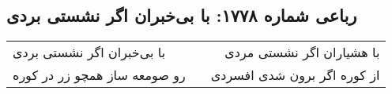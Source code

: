 \begin{center}
\section*{رباعی شماره ۱۷۷۸: با بی‌خبران اگر نشستی بردی}
\label{sec:1778}
\begin{longtable}{l p{0.5cm} r}
با بی‌خبران اگر نشستی بردی
&&
با هشیاران اگر نشستی مردی
\\
رو صومعه ساز همچو زر در کوره
&&
از کوره اگر برون شدی افسردی
\\
\end{longtable}
\end{center}
